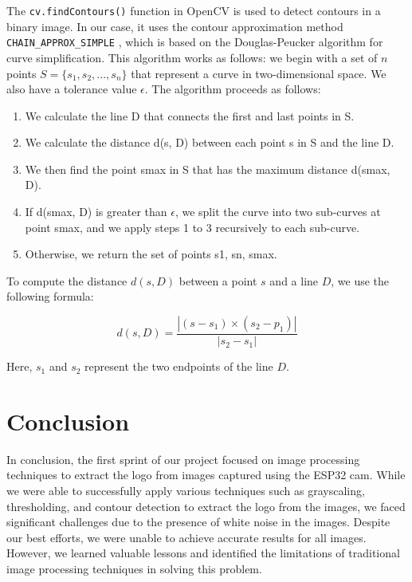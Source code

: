 The \texttt{cv.findContours()} function in OpenCV is used to detect contours in a binary image. In our case, it uses the contour approximation method \texttt{CHAIN\_APPROX\_SIMPLE} \cite{CD21}, which is based on the Douglas-Peucker algorithm for curve simplification. This algorithm works as follows:
we begin with a set of $n$ points $S = \{s_1, s_2, ..., s_n\}$ that represent a curve in two-dimensional space. We also have a tolerance value $\epsilon$. The algorithm proceeds as follows:

\begin{enumerate}
\item  We calculate the line D that connects the first and last points in S.
\item  We calculate the distance d(s, D) between each point s in S and the line D.
\item We then find the point smax in S that has the maximum distance d(smax, D).
\item If d(smax, D) is greater than $\epsilon$, we split the curve into two sub-curves at point smax, and we apply steps 1 to 3 recursively to each sub-curve.
\item Otherwise, we return the set of points {s1, sn, smax}.
\end{enumerate}

To compute the distance $d(s, D)$ between a point $s$ and a line $D$, we use the following formula:

\begin{equation*}
    d(s, D) = \frac{|(s - s_1) \times (s_2 - p_1)|}{|s_2 - s_1|}
\end{equation*}

Here, $s_1$ and $s_2$ represent the two endpoints of the line $D$.
\vspace{1em}


\section*{Conclusion}
In conclusion, the first sprint of our project focused on image processing techniques to extract the logo from images captured using the ESP32 cam. While we were able to successfully apply various techniques such as grayscaling, thresholding, and contour detection to extract the logo from the images, we faced significant challenges due to the presence of white noise in the images. Despite our best efforts, we were unable to achieve accurate results for all images. However, we learned valuable lessons and identified the limitations of traditional image processing techniques in solving this problem.

